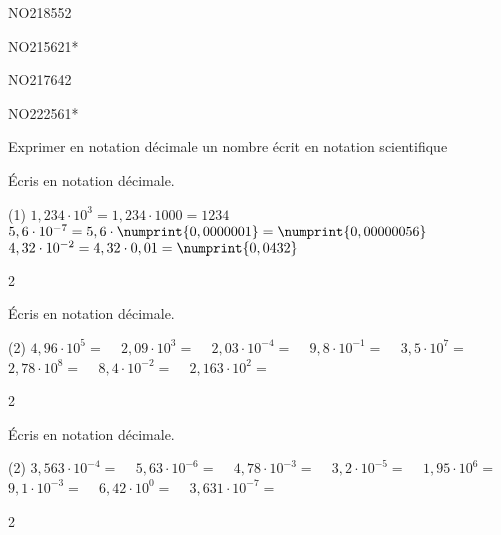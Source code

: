 \documentclass[a4paper,11pt]{report}
\begin{document}
\begin{exol}{NO218}{55}{2} %
\end{exol}

\begin{exof}{NO215}{62}{1*} %
\end{exof}

\begin{exof}{NO217}{64}{2} %
\end{exof}

\begin{exol}{NO222}{56}{1*} %
\end{exol}


\begin{resolu}{Exprimer en notation décimale un nombre écrit en notation scientifique}{
Écris en notation décimale.
\begin{tasks}(1)
    \task $1,234\cdot10^3=1,234\cdot1000=1234$
    \task $5,6\cdot10^{-7}=5,6\cdot\numprint{0,0000001}=\numprint{0,00000056}$
    \task $4,32\cdot10^{-2}=4,32\cdot0,01=\numprint{0,0432}$
\end{tasks}
}{2}
\end{resolu}


\begin{exop}{
Écris en notation décimale.

\begin{tasks}(2)
        \task $4,96\cdot10^5=$ \hrulefill~
        \task $2,09\cdot10^3=$ \hrulefill~
        \task $2,03\cdot10^{-4}=$ \hrulefill~
        \task $9,8\cdot10^{-1}=$ \hrulefill~
        \task $3,5\cdot10^{7}=$ \hrulefill~
        \task $2,78\cdot10^8=$ \hrulefill~
        \task $8,4\cdot10^{-2}=$ \hrulefill~
        \task $2,163\cdot10^{2}=$ \hrulefill~
    \end{tasks}
}{2}
\end{exop}

\begin{exop}{
Écris en notation décimale.

\begin{tasks}(2)
        \task $3,563\cdot10^{-4}=$ \hrulefill~
        \task $5,63\cdot10^{-6}=$ \hrulefill~
        \task $4,78\cdot10^{-3}=$ \hrulefill~
        \task $3,2\cdot10^{-5}=$ \hrulefill~
        \task $1,95\cdot10^{6}=$ \hrulefill~
        \task $9,1\cdot10^{-3}=$ \hrulefill~
        \task $6,42\cdot10^{0}=$ \hrulefill~
        \task $3,631\cdot10^{-7}=$ \hrulefill~
    \end{tasks}
}{2}
\end{exop}
\end{document}
